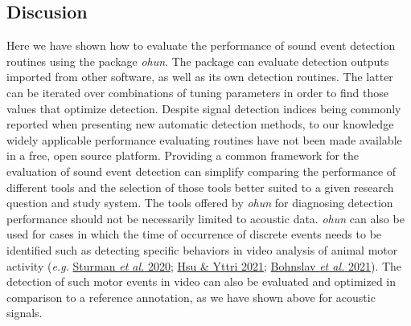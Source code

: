 \documentclass[
]{article}
\begin{document}
\hypertarget{discusion}{%
\subsection{Discusion}\label{discusion}}

Here we have shown how to evaluate the performance of sound event
detection routines using the package \emph{ohun}. The package can
evaluate detection outputs imported from other software, as well as its
own detection routines. The latter can be iterated over combinations of
tuning parameters in order to find those values that optimize detection.
Despite signal detection indices being commonly reported when presenting
new automatic detection methods, to our knowledge widely applicable
performance evaluating routines have not been made available in a free,
open source platform. Providing a common framework for the evaluation of
sound event detection can simplify comparing the performance of
different tools and the selection of those tools better suited to a
given research question and study system. The tools offered by
\emph{ohun} for diagnosing detection performance should not be
necessarily limited to acoustic data. \emph{ohun} can also be used for
cases in which the time of occurrence of discrete events needs to be
identified such as detecting specific behaviors in video analysis of
animal motor activity (\emph{e.g.}
\protect\hyperlink{ref-sturman2020}{Sturman \emph{et al.} 2020};
\protect\hyperlink{ref-hsu2021}{Hsu \& Yttri 2021};
\protect\hyperlink{ref-bohnslav2021}{Bohnslav \emph{et al.} 2021}). The
detection of such motor events in video can also be evaluated and
optimized in comparison to a reference annotation, as we have shown
above for acoustic signals.
\end{document}
